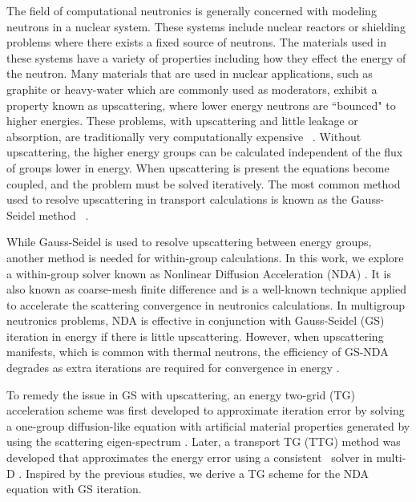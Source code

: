 
The field of computational neutronics is generally concerned with modeling neutrons in a nuclear system. These systems include nuclear reactors or shielding problems where there exists a fixed source of neutrons. The materials used in these systems have a variety of properties including how they effect the energy of the neutron. Many materials that are used in nuclear applications, such as graphite or heavy-water which are commonly used as moderators, exhibit a property known as upscattering, where lower energy neutrons are ``bounced" to higher energies. These problems, with upscattering and little leakage or absorption, are traditionally very computationally expensive ~\cite{morel-upscat}. Without upscattering, the higher energy groups can be calculated independent of the flux of groups lower in energy. When upscattering is present the equations become coupled, and the problem must be solved iteratively. The most common method used to resolve upscattering in transport calculations is known as the Gauss-Seidel method ~\cite{lewis-miller}. 

While Gauss-Seidel is used to resolve upscattering between energy groups, another method is needed for within-group calculations. In this work, we explore a within-group solver known as Nonlinear Diffusion Acceleration (NDA) \cite{morel-holo, Wang2013}. It is also known as coarse-mesh finite difference and is a well-known technique applied to accelerate the scattering convergence in neutronics calculations. In multigroup neutronics problems, NDA is effective in conjunction with Gauss-Seidel (GS) iteration in energy if there is little upscattering. However, when upscattering manifests, which is common with thermal neutrons, the efficiency of GS-NDA degrades as extra iterations are required for convergence in energy \cite{park-nda}.

To remedy the issue in GS with upscattering, an energy two-grid (TG) acceleration scheme was first developed to approximate iteration error by solving a one-group diffusion-like equation with artificial material properties generated by using the scattering eigen-spectrum \cite{morel-upscat}. Later, a transport TG (TTG) method was developed that approximates the energy error using a consistent \sn\ solver in multi-D \cite{evans-upscat}. Inspired by the previous studies, we derive a TG scheme for the NDA equation with GS iteration.

